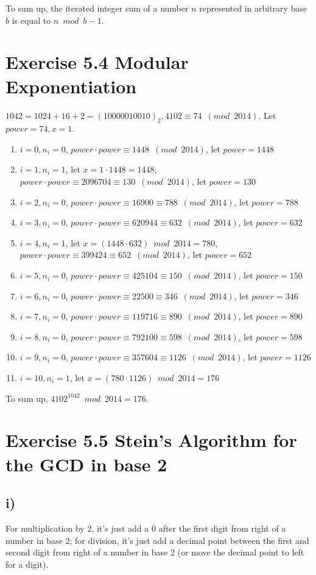 \documentclass[a4paper,12pt,titlepage]{article}
\begin{document}
To sum up, the iterated integer sum of a number $n$ represented in arbitrary base $b$ is equal to $n\,\,\, mod\,\,\, b-1$.


\section*{Exercise 5.4 Modular Exponentiation}
$1042=1024+16+2=(10000010010)_2,4102\equiv74\,\,\,(mod\,\,\,2014)$. Let $power=74,x=1$.
\begin{enumerate}
\item $i=0,n_i=0$, $power\cdot power \equiv1448 \,\,\,(mod\,\,\,2014)$, let $power=1448$
\item $i=1,n_i=1$, let $x=1\cdot1448=1448$, $power\cdot power \equiv2096704\equiv130 \,\,\,(mod\,\,\,2014)$, let $power=130$
\item $i=2,n_i=0$, $power\cdot power \equiv16900\equiv788 \,\,\,(mod\,\,\,2014)$, let $power=788$
\item $i=3,n_i=0$, $power\cdot power \equiv620944\equiv632 \,\,\,(mod\,\,\,2014)$, let $power=632$
\item $i=4,n_i=1$, let $x=(1448\cdot 632)\,\,\,mod\,\,\,2014=780$, $power\cdot power \equiv399424\equiv652 \,\,\,(mod\,\,\,2014)$, let $power=652$
\item $i=5,n_i=0$, $power\cdot power \equiv425104\equiv150 \,\,\,(mod\,\,\,2014)$, let $power=150$
\item $i=6,n_i=0$, $power\cdot power \equiv22500\equiv346 \,\,\,(mod\,\,\,2014)$, let $power=346$
\item $i=7,n_i=0$, $power\cdot power \equiv119716\equiv890 \,\,\,(mod\,\,\,2014)$, let $power=890$
\item $i=8,n_i=0$, $power\cdot power \equiv792100\equiv598 \,\,\,(mod\,\,\,2014)$, let $power=598$
\item $i=9,n_i=0$, $power\cdot power \equiv357604\equiv1126 \,\,\,(mod\,\,\,2014)$, let $power=1126$
\item $i=10,n_i=1$, let $x=(780\cdot 1126)\,\,\,mod\,\,\,2014=176$
\end{enumerate}
To sum up, $4102^{1042}\,\,\,mod\,\,\,2014=176.$

\section*{Exercise 5.5 Stein's Algorithm for the GCD in base 2}
\subsection*{i)}
For multiplication by 2, it's just add a 0 after the first digit from right of a number in base 2; for division, it's just add a decimal point between the first and second digit from right of a number in base 2 (or move the decimal point to left for a digit). 
\end{document}
